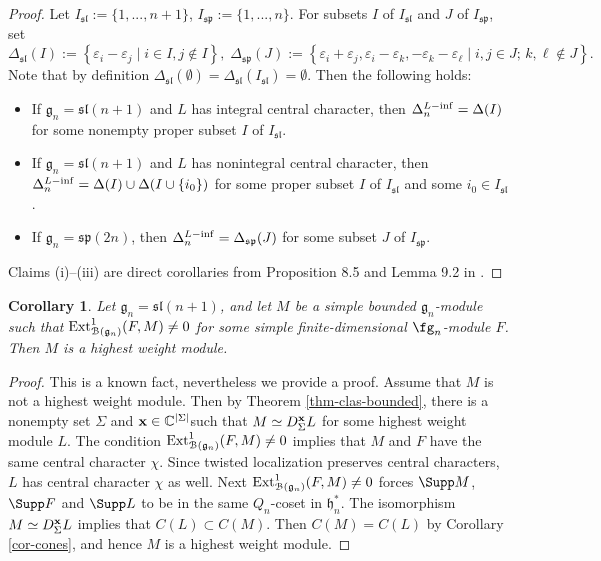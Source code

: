 \documentclass[12pt]{amsart}
\newcommand{\C}{{\mathbb C}}
\def\gg{\mathfrak{g}}
\def\gh{\mathfrak{h}}
\def\gh{\mathfrak h}
\newtheorem{cor}[thm]{Corollary}
\begin{document}
\begin{proof}
 Let  $I_{\mathfrak{sl}}:=\{1,...,n+1\}$, $I_{\mathfrak{sp}}:=\{1,...,n\}$. For subsets $I$ of $I_{\mathfrak{sl}}$  and $J$ of  $I_{\mathfrak{sp}}$, set 
$$
\Delta_{\mathfrak{sl}}(I) := \left\{\varepsilon_i - \varepsilon_j \; | \; i \in I, j \notin I  \right\}, \; \Delta_{\mathfrak{sp}}(J) :=  \left\{\varepsilon_{i} + \varepsilon_{j}, \varepsilon_{i} - \varepsilon_{k}, - \varepsilon_k - \varepsilon_{\ell} \; | \; i,j \in J; \, k,\ell \notin J  \right\}.
$$
Note that by definition $\Delta_{\mathfrak{sl}}(\emptyset) = \Delta_{\mathfrak{sl}}(I_{\mathfrak{sl}}) = \emptyset$. Then the following holds:
\begin{itemize}
\item[(i)] If $\gg_n = \mathfrak{sl}({n+1})$ and $L$ has integral central character, then $\Delta_n^{L-{\rm inf} }= \Delta(I)$ for some nonempty proper subset $I$ of $I_{\mathfrak{sl}}$.
\item[(ii)] If $\gg_n = \mathfrak{sl}({n+1})$ and $L$ has nonintegral central character, then $\Delta_n^{L-{\rm inf} }= \Delta(I) \cup \Delta(I \cup \{i_0\})$ for some proper subset 
 $I$ of $I_{\mathfrak{sl}}$ and some $i_0 \in I_{\mathfrak{sl}}$.
\item[(iii)]  If $\gg_n = \mathfrak{sp}({2n})$, then $\Delta_n^{L-{\rm inf} }= \Delta_{\mathfrak{sp}}(J)$ for some subset $J$ of $I_{\mathfrak{sp}}$.
\end{itemize}

Claims (i)--(iii) are direct corollaries from Proposition 8.5 and Lemma 9.2 in \cite{M}. \end{proof}


\begin{cor} \label{cor-ext-fd}
Let $\gg_n = \mathfrak{sl} (n+1)$, and let $M$ be a simple bounded $\gg_n$-module such that ${\rm Ext}^1_{\mathcal B (\gg_n)} (F,M) \neq 0$ for some simple finite-dimensional $\fg_n$-module $F$. Then $M$ is a highest weight module.
\end{cor}
\begin{proof}
This is a known fact, nevertheless  we provide a proof.  Assume that $M$ is not a highest weight module. Then by Theorem \ref{thm-clas-bounded}, there is a nonempty set $\Sigma$ and ${\bf x} \in \C^{|\Sigma|}$such that $M \simeq {D}_{\Sigma}^{\bf x} L$ for some highest weight module $L$. The condition ${\rm Ext}^1_{\mathcal B (\gg_n)} (F,M) \neq 0$ implies that $M$ and $F$ have the same central character $\chi$. Since twisted localization preserves central characters, $L$ has central character $\chi$ as well. Next ${\rm Ext}^1_{\mathcal B (\gg_n)} (F,M) \neq 0$ forces  $\Supp M$, $\Supp F$ and $\Supp L$ to be in the same $Q_n$-coset in $\gh_n^*$. The isomorphism  $M \simeq {D}_{\Sigma}^{\bf x} L$ implies that $C(L) \subset C(M)$. Then $C(M) = C(L)$ by Corollary \ref{cor-cones}, and hence $M$ is a highest weight module. \end{proof}
\end{document}
